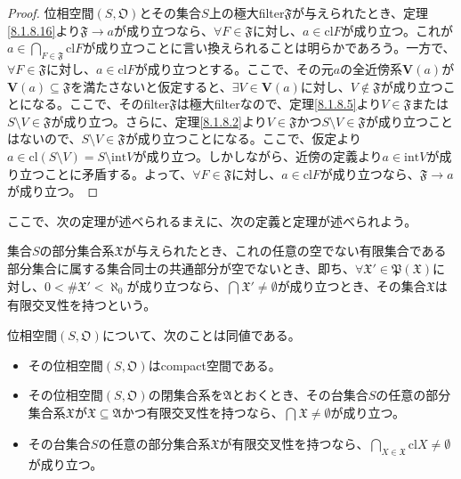 \documentclass[dvipdfmx]{jsarticle}
\begin{document}
\begin{proof}
位相空間$\left( S,\mathfrak{O} \right)$とその集合$S$上の極大filter$\mathfrak{F}$が与えられたとき、定理\ref{8.1.8.16}より$\mathfrak{F} \rightarrow a$が成り立つなら、$\forall F \in \mathfrak{F}$に対し、$a \in {\mathrm{cl}}F$が成り立つ。これが$a \in \bigcap_{F \in \mathfrak{F}} {{\mathrm{cl}}F}$が成り立つことに言い換えられることは明らかであろう。一方で、$\forall F \in \mathfrak{F}$に対し、$a \in {\mathrm{cl}}F$が成り立つとする。ここで、その元$a$の全近傍系$\mathbf{V}(a)$が$\mathbf{V}(a)\subseteq \mathfrak{F}$を満たさないと仮定すると、$\exists V \in \mathbf{V}(a)$に対し、$V \notin \mathfrak{F}$が成り立つことになる。ここで、そのfilter$\mathfrak{F}$は極大filterなので、定理\ref{8.1.8.5}より$V \in \mathfrak{F}$または$S \setminus V \in \mathfrak{F}$が成り立つ。さらに、定理\ref{8.1.8.2}より$V \in \mathfrak{F}$かつ$S \setminus V \in \mathfrak{F}$が成り立つことはないので、$S \setminus V \in \mathfrak{F}$が成り立つことになる。ここで、仮定より$a \in {\mathrm{cl}}(S \setminus V) = S \setminus {\mathrm{int}}V$が成り立つ。しかしながら、近傍の定義より$a \in {\mathrm{int}}V$が成り立つことに矛盾する。よって、$\forall F \in \mathfrak{F}$に対し、$a \in {\mathrm{cl}}F$が成り立つなら、$\mathfrak{F} \rightarrow a$が成り立つ。
\end{proof}\par
ここで、次の定理が述べられるまえに、次の定義と定理が述べられよう。
\begin{dfn*}
集合$S$の部分集合系$\mathfrak{X}$が与えられたとき、これの任意の空でない有限集合である部分集合に属する集合同士の共通部分が空でないとき、即ち、$\forall\mathfrak{X}'\in \mathfrak{P}\left( \mathfrak{X} \right)$に対し、$0 < {\#}\mathfrak{X}' < \aleph_{0}$が成り立つなら、$\bigcap_{} \mathfrak{X}' \neq \emptyset$が成り立つとき、その集合$\mathfrak{X}$は有限交叉性を持つという。
\end{dfn*}
\begin{thm*}
位相空間$\left( S,\mathfrak{O} \right)$について、次のことは同値である。
\begin{itemize}
\item
  その位相空間$\left( S,\mathfrak{O} \right)$はcompact空間である。
\item
  その位相空間$\left( S,\mathfrak{O} \right)$の閉集合系を$\mathfrak{A}$とおくとき、その台集合$S$の任意の部分集合系$\mathfrak{X}$が$\mathfrak{X \subseteq A}$かつ有限交叉性を持つなら、$\bigcap_{} \mathfrak{X} \neq \emptyset$が成り立つ。
\item
  その台集合$S$の任意の部分集合系$\mathfrak{X}$が有限交叉性を持つなら、$\bigcap_{X \in \mathfrak{X}} {{\mathrm{cl}}X} \neq \emptyset$が成り立つ。
\end{itemize}
\end{thm*}\par
\end{document}

